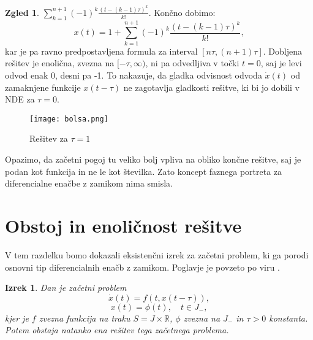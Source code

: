 \documentclass[12pt,a4paper]{amsart}
\theoremstyle{definition} %
\newtheorem{zgled}[definicija]{Zgled}
\theoremstyle{plain} %
\newtheorem{izrek}[definicija]{Izrek}
\newcommand{\R}{\mathbb R}
\begin{document}
\begin{zgled}
     $\sum_{k=1}^{n+1}(-1)^{k}\frac{(t-(k-1)\tau)^k}{k!}$. Končno dobimo:
     \[x(t) = 1+ \sum_{k=1}^{n+1}(-1)^{k}\frac{(t-(k-1)\tau)^k}{k!},\]
    kar je pa ravno predpostavljena formula za interval $[n\tau, (n+1)\tau].$
    Dobljena rešitev je enolična, zvezna na $[-\tau,\infty)$, ni pa odvedljiva v točki $t=0$, saj je 
    levi odvod enak 0, desni pa -1. To nakazuje, da gladka odvisnost odvoda $\dot{x}(t)$ od zamaknjene
    funkcije $x(t-\tau)$
    ne zagotavlja gladkosti rešitve, ki bi jo dobili
    v NDE za $\tau=0$. %
    \begin{figure}[h]
        \texttt{[image: bolsa.png]}
        \caption{Rešitev za $\tau=1$}
    \end{figure}
\end{zgled}
\noindent Opazimo, da začetni pogoj tu veliko bolj vpliva na obliko končne rešitve, saj je podan kot funkcija in 
ne le kot številka. Zato koncept faznega portreta za diferencialne enačbe z zamikom nima smisla.


\section{Obstoj in enoličnost rešitve}

V tem razdelku bomo dokazali eksistenčni izrek
za začetni problem, ki ga porodi osnovni tip diferencialnih enačb z zamikom. Poglavje je povzeto po 
viru \cite{angdiploma}.

\begin{izrek}
    Dan je začetni problem $$\dot{x}(t)=f(t,x(t-\tau)),$$
    $$x(t)=\phi(t),\quad t\in J_{-},$$ kjer je $f$ zvezna funkcija na traku $S=J \times \R$, $\phi$ zvezna na $J_{-}$ in $\tau >0$
    konstanta. Potem obstaja natanko ena rešitev tega začetnega problema.
\end{izrek}
\end{document}
